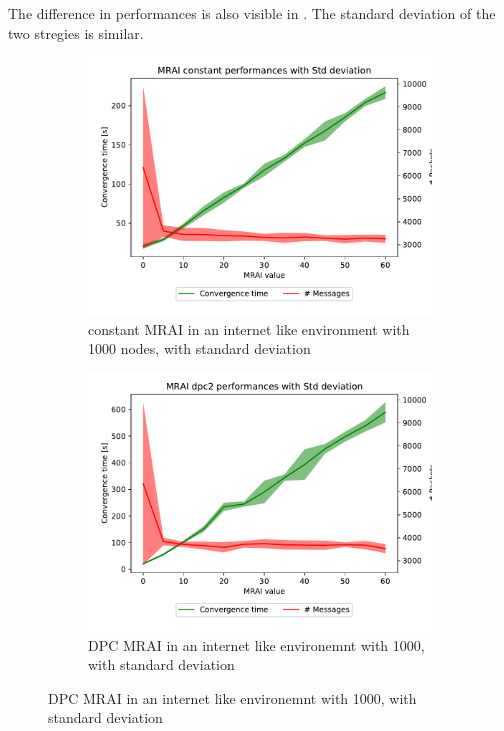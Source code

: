 \documentclass[10pt,conference,letterpaper]{IEEEtran}
\newcommand{\figwidth}{0.78}
\begin{document}
The difference in performances is also visible in .
The standard deviation of the two stregies is similar.

\begin{figure}[tb]
	\centering

	\begin{subfigure}{\columnwidth}
		\centering
		\includegraphics[width=\figwidth\columnwidth]{images/internet_like/S_AW/1000_evolution/pareto-internet_like-1000-constant-d8_mrai_evolution_std_alpha.pdf}
		\caption{constant \ac{MRAI} in an internet like environment with \num{1000} nodes, with standard deviation}
		\label{fig:s_aw_constant_mrai_1000_std}
		\qquad
	\end{subfigure}

	\begin{subfigure}{\columnwidth}
		\centering
		\includegraphics[width=\figwidth\columnwidth]{images/internet_like/S_AW/1000_evolution/pareto-internet_like-1000-dpc-d8_mrai_evolution_std_alpha.pdf}
		\caption{\ac{DPC} \ac{MRAI} in an internet like environemnt with \num{1000}, with standard deviation}
		\label{fig:s_aw_dpc_mrai_1000_std}
		\qquad
	\end{subfigure}


\end{figure}
\end{document}
